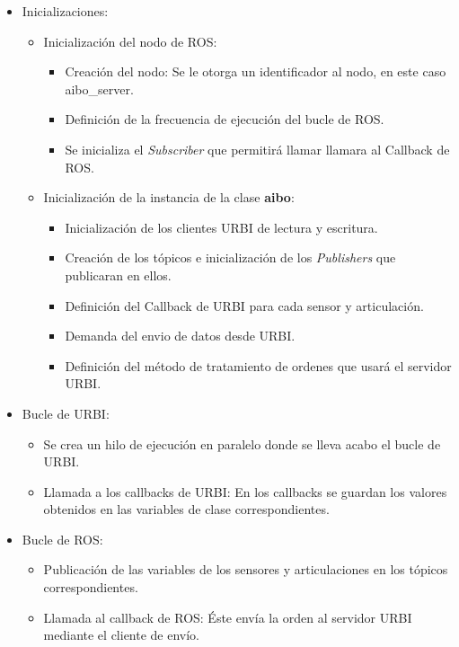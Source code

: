 \documentclass[12pt,a4paper,final,twoside]{book}
\begin{document}
\begin{itemize}
\item Inicializaciones: 
\begin{itemize}
\item Inicialización del nodo de ROS:
\begin{itemize}
\item Creación del nodo: Se le otorga un identificador al nodo, en este caso aibo{\_}server.
\item Definición de la frecuencia de ejecución del bucle de ROS.
\item Se inicializa el \textit{Subscriber} que permitirá llamar llamara al Callback de ROS.   
\end{itemize}

\item Inicialización de la instancia de la clase \textbf{aibo}:
\begin{itemize}
\item Inicialización de los clientes URBI de lectura y escritura.
\item Creación de los tópicos e inicialización de los \textit{Publishers} que publicaran en ellos.
\item Definición del Callback de URBI para cada sensor y articulación.
\item Demanda del envio de datos desde URBI.
\item Definición del método de tratamiento de ordenes que usará el servidor URBI.
\end{itemize}
\end{itemize}
\item Bucle de URBI:
\begin{itemize}
\item Se crea un hilo de ejecución en paralelo donde se lleva acabo el bucle de URBI.
\item Llamada a los callbacks de URBI: En los callbacks se guardan los valores obtenidos en las variables de clase correspondientes.

\end{itemize}
\item Bucle de ROS:
\begin{itemize}
\item Publicación de las variables de los sensores y articulaciones en los tópicos correspondientes.
\item Llamada al callback de ROS: Éste envía la orden al servidor URBI mediante el cliente de envío.
\end{itemize}
\end{itemize}
\end{document}
